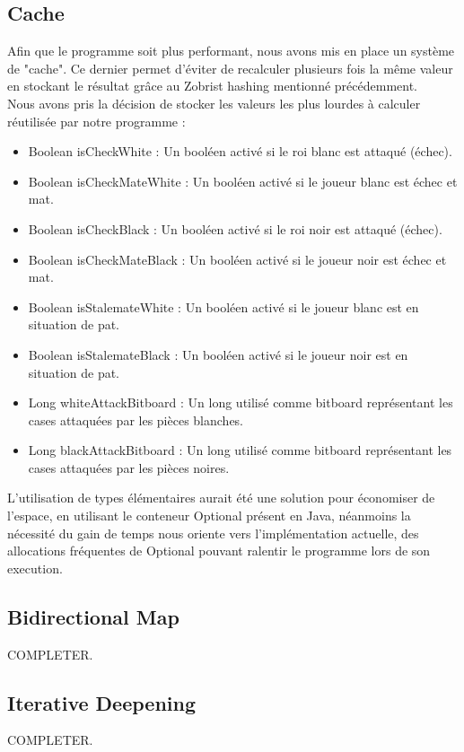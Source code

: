 \documentclass{article}
\begin{document}
\subsection{Cache}
Afin que le programme soit plus performant, nous avons mis en place un système de "cache". Ce dernier permet d'éviter de recalculer plusieurs fois la même valeur en stockant le résultat grâce au Zobrist hashing mentionné précédemment.\\


Nous avons pris la décision de stocker les valeurs les plus lourdes à calculer réutilisée par notre programme :
\begin{itemize}
    \item Boolean isCheckWhite : Un booléen activé si le roi blanc est attaqué (échec).
    \item Boolean isCheckMateWhite : Un booléen activé si le joueur blanc est échec et mat.
    \item Boolean isCheckBlack : Un booléen activé si le roi noir est attaqué (échec).
    \item Boolean isCheckMateBlack : Un booléen activé si le joueur noir est échec et mat.
    \item Boolean isStalemateWhite : Un booléen activé si le joueur blanc est en situation de pat.
    \item Boolean isStalemateBlack : Un booléen activé si le joueur noir est en situation de pat.
    \item Long whiteAttackBitboard : Un long utilisé comme bitboard représentant les cases attaquées par les pièces blanches.
    \item Long blackAttackBitboard : Un long utilisé comme bitboard représentant les cases attaquées par les pièces noires.\\
\end{itemize}

L'utilisation de types élémentaires aurait été une solution pour économiser de l'espace, en utilisant le conteneur Optional présent en Java, néanmoins la nécessité du gain de temps nous oriente vers l'implémentation actuelle, des allocations fréquentes de Optional pouvant ralentir le programme lors de son execution.

\subsection{Bidirectional Map}
COMPLETER.

\subsection{Iterative Deepening}
COMPLETER.
\end{document}
